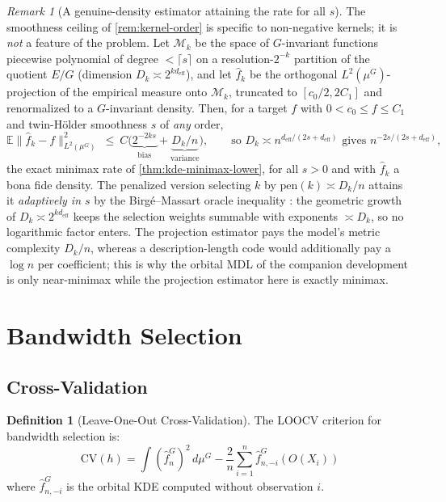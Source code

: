 \documentclass[11pt,twoside,openright]{book}
\theoremstyle{plain}
\theoremstyle{definition}
\newtheorem{definition}[theorem]{Definition}
\theoremstyle{remark}
\newtheorem{remark}[theorem]{Remark}
\newcommand{\calM}{\mathcal{M}}
\newcommand{\norm}[1]{\|#1\|}
\newcommand{\E}{\mathbb{E}}
\newcommand{\deff}{d_{\mathrm{eff}}}
\begin{document}
\begin{remark}[A genuine-density estimator attaining the rate for all $s$]
\label{rem:projection-alls}
The smoothness ceiling of \cref{rem:kernel-order} is specific to non-negative kernels; it is \emph{not} a feature of the problem. Let $\calM_k$ be the space of $G$-invariant functions piecewise polynomial of degree $<\lceil s\rceil$ on a resolution-$2^{-k}$ partition of the quotient $E/G$ (dimension $D_k\asymp 2^{k\deff}$), and let $\widehat f_k$ be the orthogonal $L^2(\mu^G)$-projection of the empirical measure onto $\calM_k$, truncated to $[c_0/2,2C_1]$ and renormalized to a $G$-invariant density. Then, for a target $f$ with $0<c_0\le f\le C_1$ and twin-Hölder smoothness $s$ of \emph{any} order,
\[
\E\norm{\widehat f_k-f}_{L^2(\mu^G)}^2
\ \le\ C\big(\underbrace{2^{-2ks}}_{\text{bias}}+\underbrace{D_k/n}_{\text{variance}}\big),
\qquad\text{so } D_k\asymp n^{\deff/(2s+\deff)} \text{ gives } n^{-2s/(2s+\deff)},
\]
the exact minimax rate of \cref{thm:kde-minimax-lower}, for all $s>0$ and with $\widehat f_k$ a bona fide density. The penalized version selecting $k$ by $\mathrm{pen}(k)\asymp D_k/n$ attains it \emph{adaptively in $s$} by the Birg\'e--Massart oracle inequality \cite{BirgeMassart1998,Massart2007}: the geometric growth of $D_k\asymp 2^{k\deff}$ keeps the selection weights summable with exponents $\asymp D_k$, so no logarithmic factor enters. The projection estimator pays the model's metric complexity $D_k/n$, whereas a description-length code would additionally pay a $\log n$ per coefficient; this is why the orbital MDL of the companion development is only near-minimax while the projection estimator here is exactly minimax.
\end{remark}

\section{Bandwidth Selection}

\subsection{Cross-Validation}

\begin{definition}[Leave-One-Out Cross-Validation]
The LOOCV criterion for bandwidth selection is:
\begin{equation}
\text{CV}(h) = \int (\hat{f}_n^G)^2 \, d\mu^G - \frac{2}{n} \sum_{i=1}^n \hat{f}_{n,-i}^G(O(X_i))
\label{eq:cv-criterion}
\end{equation}
where $\hat{f}_{n,-i}^G$ is the orbital KDE computed without observation $i$.
\end{definition}
\end{document}
